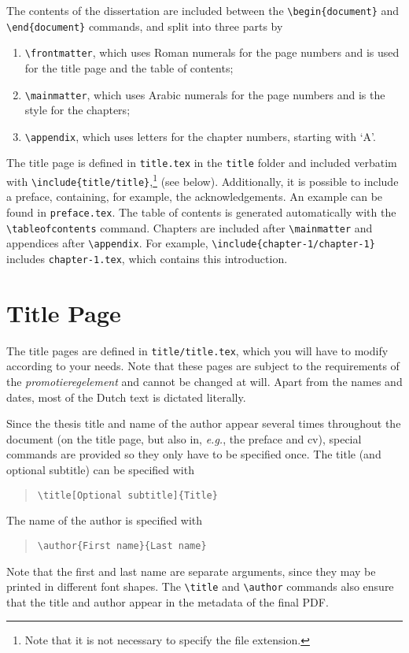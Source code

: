 The contents of the dissertation are included between the \texttt{\textbackslash begin\{document\}} and \texttt{\textbackslash end\{document\}} commands, and split into three parts by
\begin{enumerate}
\item\texttt{\textbackslash frontmatter}, which uses Roman numerals for the page numbers and is used for the title page and the table of contents;
\item\texttt{\textbackslash mainmatter}, which uses Arabic numerals for the page numbers and is the style for the chapters;
\item\texttt{\textbackslash appendix}, which uses letters for the chapter numbers, starting with `A'.
\end{enumerate}
The title page is defined in \texttt{title.tex} in the \texttt{title} folder and included verbatim with \texttt{\textbackslash include\{title/title\}},\footnote{Note that it is not necessary to specify the file extension.} (see below). Additionally, it is possible to include a preface, containing, for example, the acknowledgements. An example can be found in \texttt{preface.tex}. The table of contents is generated automatically with the \texttt{\textbackslash tableofcontents} command. Chapters are included after \texttt{\textbackslash mainmatter} and appendices after \texttt{\textbackslash appendix}. For example, \texttt{\textbackslash include\{chapter-1/chapter-1\}} includes \texttt{chapter-1.tex}, which contains this introduction.

\section{Title Page}

The title pages are defined in \texttt{title/title.tex}, which you will have to modify according to your needs. Note that these pages are subject to the requirements of the \emph{promotieregelement} and cannot be changed at will. Apart from the names and dates, most of the Dutch text is dictated literally.

Since the thesis title and name of the author appear several times throughout the document (on the title page, but also in, \emph{e.g.}, the preface and cv), special commands are provided so they only have to be specified once. The title (and optional subtitle) can be specified with

\begin{quote}
\texttt{\textbackslash title[Optional subtitle]\{Title\}}
\end{quote}
The name of the author is specified with
\begin{quote}
\texttt{\textbackslash author\{First name\}\{Last name\}}
\end{quote}
Note that the first and last name are separate arguments, since they may be printed in different font shapes. The \texttt{\textbackslash title} and \texttt{\textbackslash author} commands also ensure that the title and author appear in the metadata of the final PDF.

